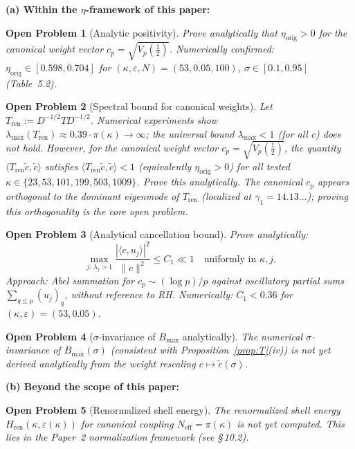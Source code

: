 \documentclass[11pt]{article}
\newtheorem*{openproblem}{Open Problem}
\newcommand{\etaorig}{\eta_{\mathrm{orig}}}
\newcommand{\Tren}{T_{\mathrm{ren}}}
\newcommand{\Hren}{H_{\mathrm{ren}}}
\begin{document}
\textbf{(a) Within the $\eta$-framework of this paper:}

\begin{openproblem}[Analytic positivity]
Prove analytically that $\etaorig>0$ for the canonical weight vector
$c_p=\sqrt{V_p({\textstyle\frac12})}$. %
Numerically confirmed: $\etaorig\in[0.598,0.704]$ for $(\kappa,\varepsilon,N)=(53,0.05,100)$,
$\sigma\in[0.1,0.95]$ (Table~5.2).
\end{openproblem}

\begin{openproblem}[Spectral bound for canonical weights]
Let $\Tren:=D^{-1/2}TD^{-1/2}$.
Numerical experiments show $\lambda_{\max}(\Tren)\approx 0.39\cdot\pi(\kappa)\to\infty$;
the universal bound $\lambda_{\max}<1$ (for all $c$) does not hold.
However, for the canonical weight vector $c_p=\sqrt{V_p({\textstyle\frac12})}$, %
the quantity $\langle\Tren\tilde{c},\tilde{c}\rangle$ satisfies
$\langle\Tren\tilde{c},\tilde{c}\rangle<1$ (equivalently $\etaorig>0$)
for all tested $\kappa\in\{23,53,101,199,503,1009\}$.
Prove this analytically. The canonical $c_p$ appears orthogonal to the
dominant eigenmode of $\Tren$ (localized at $\gamma_1=14.13\ldots$);
proving this orthogonality is the core open problem.
\end{openproblem}

\begin{openproblem}[Analytical cancellation bound]
Prove analytically:
\[
\max_{j:\,\lambda_j>1}\frac{|\langle c,u_j\rangle|^2}{\|c\|^2}\leq C_1\ll 1
\quad\text{uniformly in }\kappa,j.
\]
Approach: Abel summation for $c_p\sim(\log p)/p$ against oscillatory partial
sums $\sum_{q\leq p}(u_j)_q$, without reference to RH.
Numerically: $C_1<0.36$ for $(\kappa,\varepsilon)=(53,0.05)$.
\end{openproblem}

\begin{openproblem}[$\sigma$-invariance of $B_{\max}$ analytically]
The numerical $\sigma$-invariance of $B_{\max}(\sigma)$ (consistent with
Proposition~\ref{prop:T}(iv)) is not yet derived analytically from the weight
rescaling $c\mapsto\tilde{c}(\sigma)$.
\end{openproblem}

\textbf{(b) Beyond the scope of this paper:}

\begin{openproblem}[Renormalized shell energy]
The renormalized shell energy $\Hren(\kappa,\varepsilon(\kappa))$ for canonical
coupling $N_{\mathrm{eff}}=\pi(\kappa)$ is not yet computed. This lies in the
Paper~2 normalization framework (see \S\,10.2).
\end{openproblem}
\end{document}
